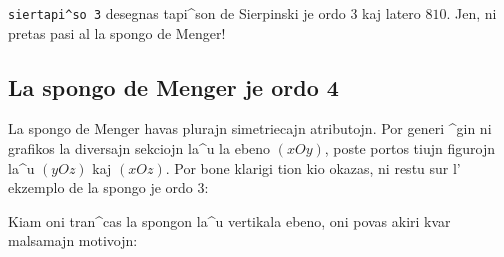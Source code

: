 \texttt{siertapi^so 3} desegnas tapi^son de Sierpinski je ordo $3$ kaj
latero $810$.  Jen, ni pretas pasi al la spongo de Menger!

\subsection{La spongo de Menger je ordo 4}

La spongo de Menger havas plurajn simetriecajn atributojn.  Por generi
^gin ni grafikos la diversajn sekciojn la^u la ebeno $(xOy)$, poste
portos tiujn figurojn la^u $(yOz)$ kaj $(xOz)$. Por bone klarigi tion
kio okazas, ni restu sur l' ekzemplo de la spongo je ordo $3$:

Kiam oni tran^cas la spongon la^u vertikala ebeno, oni povas akiri kvar malsamajn motivojn:
\vspace*{0.6cm}
